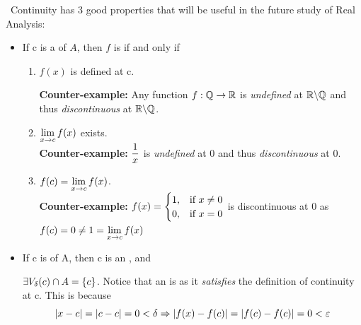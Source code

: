\documentclass[a4paper,12pt]{article}
\begin{document}
\begin{remark}\ 
    Continuity has 3 good properties that will be useful in the future study of Real Analysis:
    \begin{itemize}
        \item If c is a  of \(A\), then \(f\) is  if and only if
        \begin{enumerate}
            \item \(f(x)\) is defined at c.
            
            \textbf{Counter-example:} Any function \(f:\mathbb{Q}\rightarrow\mathbb{R}\) is \textit{undefined} at \(\mathbb{R}\backslash\mathbb{Q}\) and thus \textit{discontinuous} at \(\mathbb{R}\backslash\mathbb{Q}\).

            \item \(\displaystyle\lim_{x\rightarrow c } {f(x )}\) exists.\\
            \textbf{Counter-example:} \(\displaystyle \frac{1}{x} \) is \textit{undefined} at 0 and thus \textit{discontinuous} at 0.

            \item \(\displaystyle f(c)=\lim_{x\rightarrow c } {f(x )}\).\\
            \textbf{Counter-example:} \(\displaystyle f(x)=\begin{cases}
                1, & \text{if }x\neq 0 \\
                0, & \text{if }x=0
            \end{cases}\) is discontinuous at 0 as \\ \(\displaystyle f(c) = 0 \neq 1=\lim_{x\rightarrow c } {f(x )}\)
        \end{enumerate}
        \item If c is  of A, then c is an , and
        
        \(\displaystyle \exists V_{\delta}{(c )}\cap A=\{c \}\). Notice that an  is  
        as it \textit{satisfies} the definition of continuity at c. This is because
        \[\left\lvert x-c\right\rvert=\left\lvert c-c\right\rvert=0<\delta\Rightarrow\left\lvert f(x)-f(c)\right\rvert=\left\lvert f(c)-f(c)\right\rvert=0<\varepsilon\]
    \end{itemize}
\end{remark}
\end{document}
